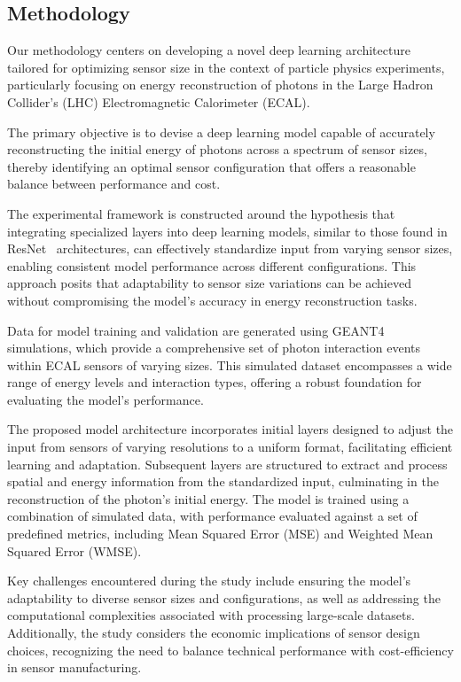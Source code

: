 \documentclass[conference]{IEEEtran}
\begin{document}
\subsection{Methodology}\label{main_body:methodology}
Our methodology centers on developing a novel deep learning architecture tailored for optimizing sensor size in the context of particle physics experiments, particularly focusing on energy reconstruction of photons in the Large Hadron Collider's (LHC) Electromagnetic Calorimeter (ECAL).

The primary objective is to devise a deep learning model capable of accurately reconstructing the initial energy of photons across a spectrum of sensor sizes, thereby identifying an optimal sensor configuration that offers a reasonable balance between performance and cost.

The experimental framework is constructed around the hypothesis that integrating specialized layers into deep learning models, similar to those found in ResNet~\cite{he2015deep} architectures, can effectively standardize input from varying sensor sizes, enabling consistent model performance across different configurations. This approach posits that adaptability to sensor size variations can be achieved without compromising the model's accuracy in energy reconstruction tasks.

Data for model training and validation are generated using GEANT4~\cite{AGOSTINELLI2003250} simulations, which provide a comprehensive set of photon interaction events within ECAL sensors of varying sizes. This simulated dataset encompasses a wide range of energy levels and interaction types, offering a robust foundation for evaluating the model's performance.

The proposed model architecture incorporates initial layers designed to adjust the input from sensors of varying resolutions to a uniform format, facilitating efficient learning and adaptation. Subsequent layers are structured to extract and process spatial and energy information from the standardized input, culminating in the reconstruction of the photon's initial energy. The model is trained using a combination of simulated data, with performance evaluated against a set of predefined metrics, including Mean Squared Error (MSE) and Weighted Mean Squared Error (WMSE).

Key challenges encountered during the study include ensuring the model's adaptability to diverse sensor sizes and configurations, as well as addressing the computational complexities associated with processing large-scale datasets. Additionally, the study considers the economic implications of sensor design choices, recognizing the need to balance technical performance with cost-efficiency in sensor manufacturing.
\end{document}
